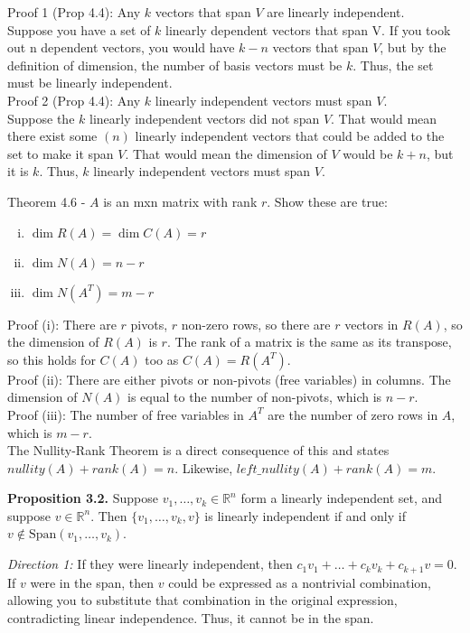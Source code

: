 \documentclass[12pt]{article}
\begin{document}
Proof 1 (Prop 4.4): Any $k$ vectors that span $V$ are linearly independent.\\
Suppose you have a set of $k$ linearly dependent vectors that span V. If you took out n dependent
vectors, you would have $k-n$ vectors that span $V$, but by the definition of dimension, the number
of basis vectors must be $k$. Thus, the set must be linearly independent.\\
Proof 2 (Prop 4.4): Any $k$ linearly independent vectors must span $V$.\\
Suppose the $k$ linearly independent vectors did not span $V$. That would mean there exist some
$(n)$ linearly independent vectors that could be added to the set to make it span $V$. That would
mean the dimension of $V$ would be $k+n$, but it is $k$. Thus, $k$ linearly independent vectors must
span $V$.

Theorem 4.6 - $A$ is an mxn matrix with rank $r$. Show these are true:

\begin{enumerate}[(i)]
\item $\dim R(A)=\dim C(A)=r$
\item $\dim N(A)=n-r$
\item $\dim N(A^T)=m-r$
\end{enumerate}

Proof (i): There are $r$ pivots, $r$ non-zero rows, so there are $r$ vectors in $R(A)$, so the dimension of
$R(A)$ is $r$. The rank of a matrix is the same as its transpose, so this holds for $C(A)$ too as
$C(A)=R(A^T)$.\\
Proof (ii): There are either pivots or non-pivots (free variables) in columns. The dimension of
$N(A)$ is equal to the number of non-pivots, which is $n-r$.\\
Proof (iii): The number of free variables in $A^T$ are the number of zero rows in $A$, which is $m-r$.\\
The Nullity-Rank Theorem is a direct consequence of this and states $nullity(A)+rank(A)=n$.
Likewise, $left\_nullity(A)+rank(A)=m$.

\textbf{Proposition 3.2.} Suppose \( v_1, \ldots, v_k \in \mathbb{R}^n \) form a linearly independent set, and suppose \( v \in \mathbb{R}^n \). Then \( \{v_1, \ldots, v_k, v\} \) is linearly independent if and only if \( v \notin \text{Span} (v_1, \ldots, v_k) \).

\textit{Direction 1:} If they were linearly independent, then \( c_1v_1 + \ldots + c_kv_k + c_{k+1}v = 0 \). If \( v \) were in the span, then \( v \) could be expressed as a nontrivial combination, allowing you to substitute that combination in the original expression, contradicting linear independence. Thus, it cannot be in the span.
\end{document}
